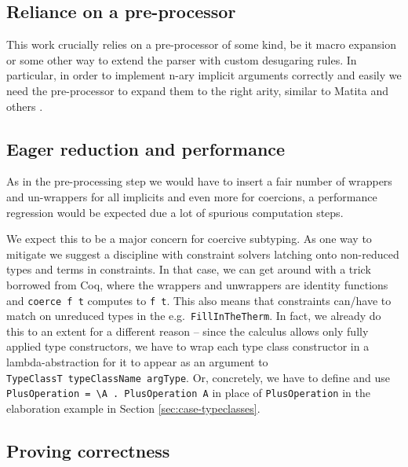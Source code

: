 \documentclass[
  sigconf,
  screen,
  review]{acmart}
\begin{document}
\hypertarget{reliance-on-a-pre-processor}{%
\subsection{Reliance on a
pre-processor}\label{reliance-on-a-pre-processor}}

This work crucially relies on a pre-processor of some kind, be it macro
expansion or some other way to extend the parser with custom desugaring
rules. In particular, in order to implement n-ary implicit arguments
correctly and easily we need the pre-processor to expand them to the
right arity, similar to
Matita\citep[chap.~5]{tassiBiDirectionalRefinementAlgorithm2012} and
others
\citep{serranoQuickLookImpredicativity2020, kovacsElaborationFirstclassImplicit2020}.

\hypertarget{eager-reduction-and-performance}{%
\subsection{Eager reduction and
performance}\label{eager-reduction-and-performance}}

As in the pre-processing step we would have to insert a fair number of
wrappers and un-wrappers for all implicits and even more for coercions,
a performance regression would be expected due a lot of spurious
computation steps.

We expect this to be a major concern for coercive subtyping. As one way
to mitigate we suggest a discipline with constraint solvers latching
onto non-reduced types and terms in constraints. In that case, we can
get around with a trick borrowed from Coq, where the wrappers and
unwrappers are identity functions and \texttt{coerce\ f\ t} computes to
\texttt{f\ t}. This also means that constraints can/have to match on
unreduced types in the e.g.~\texttt{FillInTheTherm}. In fact, we already
do this to an extent for a different reason -- since the calculus allows
only fully applied type constructors, we have to wrap each type class
constructor in a lambda-abstraction for it to appear as an argument to
\texttt{TypeClassT\ typeClassName\ argType}. Or, concretely, we have to
define and use
\texttt{PlusOperation\textquotesingle{}\ =\ \textbackslash{}A\ .\ PlusOperation\ A}
in place of \texttt{PlusOperation} in the elaboration example in Section
\ref{sec:case-typeclasses}.

\hypertarget{proving-correctness}{%
\subsection{Proving correctness}\label{proving-correctness}}
\end{document}
